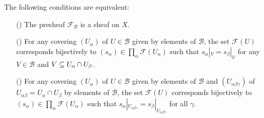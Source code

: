 \begin{proposition}\label{sheaf on basis sheaf condition}
The following conditions are equivalent:
\begin{itemize}
\item[(\rmnum{1})] The presheaf $\mathscr{F}_{\mathcal{B}}$ is a sheaf on $X$.
\item[(\rmnum{2})] For any covering $(U_\alpha)$ of $U\in\mathcal{B}$ given by elements of $\mathcal{B}$, the set $\mathscr{F}(U)$ corresponds bijectively to $(s_\alpha)\in\prod_\alpha\mathscr{F}(U_\alpha)$ such that $s_\alpha|_V=s_\beta|_V$ for any $V\in\mathcal{B}$ and $V\subseteq U_\alpha\cap U_\beta$.
\item[(\rmnum{3})] For any covering $(U_\alpha)$ of $U\in\mathcal{B}$ given by elements of $\mathcal{B}$ and $(U_{\alpha\beta\gamma})$ of $U_{\alpha\beta}=U_\alpha\cap U_\beta$ by elements of $\mathcal{B}$, the set $\mathscr{F}(U)$ corresponds bijectively to $(s_\alpha)\in\prod_\alpha\mathscr{F}(U_\alpha)$ such that $s_\alpha|_{U_{\alpha\beta\gamma}}=s_\beta|_{U_{\alpha\beta\gamma}}$ for all $\gamma$.
\end{itemize}
\end{proposition}

